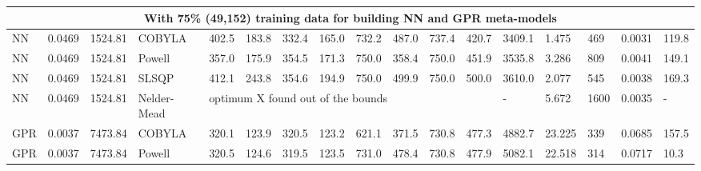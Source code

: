 \begin{tabular}{|lllllllllllllllll|}
\multicolumn{17}{|c|}{With 75\% (49,152) training data for building NN and GPR meta-models} \\ \hline
\multicolumn{1}{|l|}{NN} & \multicolumn{1}{l|}{0.0469} & \multicolumn{1}{l|}{1524.81} & \multicolumn{1}{l|}{COBYLA} & \multicolumn{1}{l|}{402.5} & \multicolumn{1}{l|}{183.8} & \multicolumn{1}{l|}{332.4} & \multicolumn{1}{l|}{165.0} & \multicolumn{1}{l|}{732.2} & \multicolumn{1}{l|}{487.0} & \multicolumn{1}{l|}{737.4} & \multicolumn{1}{l|}{420.7} & \multicolumn{1}{l|}{3409.1} & \multicolumn{1}{l|}{1.475} & \multicolumn{1}{l|}{469} & \multicolumn{1}{l|}{0.0031} & 119.8 \\ \hline
\multicolumn{1}{|l|}{NN} & \multicolumn{1}{l|}{0.0469} & \multicolumn{1}{l|}{1524.81} & \multicolumn{1}{l|}{Powell} & \multicolumn{1}{l|}{357.0} & \multicolumn{1}{l|}{175.9} & \multicolumn{1}{l|}{354.5} & \multicolumn{1}{l|}{171.3} & \multicolumn{1}{l|}{750.0} & \multicolumn{1}{l|}{358.4} & \multicolumn{1}{l|}{750.0} & \multicolumn{1}{l|}{451.9} & \multicolumn{1}{l|}{3535.8} & \multicolumn{1}{l|}{3.286} & \multicolumn{1}{l|}{809} & \multicolumn{1}{l|}{0.0041} & 149.1 \\ \hline
\multicolumn{1}{|l|}{NN} & \multicolumn{1}{l|}{0.0469} & \multicolumn{1}{l|}{1524.81} & \multicolumn{1}{l|}{SLSQP} & \multicolumn{1}{l|}{412.1} & \multicolumn{1}{l|}{243.8} & \multicolumn{1}{l|}{354.6} & \multicolumn{1}{l|}{194.9} & \multicolumn{1}{l|}{750.0} & \multicolumn{1}{l|}{499.9} & \multicolumn{1}{l|}{750.0} & \multicolumn{1}{l|}{500.0} & \multicolumn{1}{l|}{3610.0} & \multicolumn{1}{l|}{2.077} & \multicolumn{1}{l|}{545} & \multicolumn{1}{l|}{0.0038} & 169.3 \\ \hline
\multicolumn{1}{|l|}{NN} & \multicolumn{1}{l|}{0.0469} & \multicolumn{1}{l|}{1524.81} & \multicolumn{1}{l|}{Nelder-Mead} & \multicolumn{8}{l|}{optimum X found out of the bounds} & \multicolumn{1}{l|}{-} & \multicolumn{1}{l|}{5.672} & \multicolumn{1}{l|}{1600} & \multicolumn{1}{l|}{0.0035} & - \\ \hline
\multicolumn{1}{|l|}{GPR} & \multicolumn{1}{l|}{0.0037} & \multicolumn{1}{l|}{7473.84} & \multicolumn{1}{l|}{COBYLA} & \multicolumn{1}{l|}{320.1} & \multicolumn{1}{l|}{123.9} & \multicolumn{1}{l|}{320.5} & \multicolumn{1}{l|}{123.2} & \multicolumn{1}{l|}{621.1} & \multicolumn{1}{l|}{371.5} & \multicolumn{1}{l|}{730.8} & \multicolumn{1}{l|}{477.3} & \multicolumn{1}{l|}{4882.7} & \multicolumn{1}{l|}{23.225} & \multicolumn{1}{l|}{339} & \multicolumn{1}{l|}{0.0685} & 157.5 \\ \hline
\multicolumn{1}{|l|}{GPR} & \multicolumn{1}{l|}{0.0037} & \multicolumn{1}{l|}{7473.84} & \multicolumn{1}{l|}{Powell} & \multicolumn{1}{l|}{320.5} & \multicolumn{1}{l|}{124.6} & \multicolumn{1}{l|}{319.5} & \multicolumn{1}{l|}{123.5} & \multicolumn{1}{l|}{731.0} & \multicolumn{1}{l|}{478.4} & \multicolumn{1}{l|}{730.8} & \multicolumn{1}{l|}{477.9} & \multicolumn{1}{l|}{5082.1} & \multicolumn{1}{l|}{22.518} & \multicolumn{1}{l|}{314} & \multicolumn{1}{l|}{0.0717} & 10.3 \\ \hline

\end{tabular}
